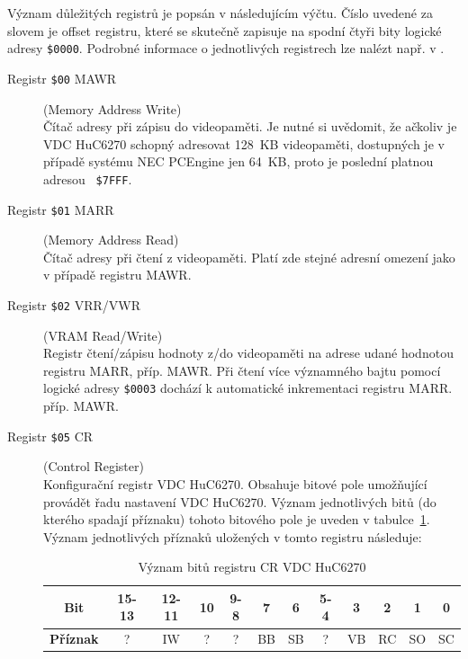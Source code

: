 Význam důležitých registrů je popsán v následujícím výčtu. Číslo uvedené za
slovem  je offset registru, které se skutečně zapisuje na spodní
čtyři bity logické adresy {\tt \$0000}. Podrobné informace o jednotlivých
registrech lze nalézt např. v \cite{Schleussinger98}.

\begin{description}
\item[Registr {\tt \$00} {\sf MAWR}] (Memory Address Write) \\
	Čítač adresy při zápisu do videopaměti. Je nutné si uvědomit, že ačkoliv je
	VDC HuC6270 schopný adresovat 128~KB videopaměti, dostupných je v případě
	systému NEC PCEngine jen 64~KB, proto je poslední platnou adresou {\tt
	\$7FFF}.

\item[Registr {\tt \$01} {\sf MARR}] (Memory Address Read) \\
	Čítač adresy při čtení z videopaměti. Platí zde stejné adresní omezení jako
	v případě registru {\sf MAWR}.

\item[Registr {\tt \$02} {\sf VRR/VWR}] (VRAM Read/Write) \\
	Registr čtení/zápisu hodnoty z/do videopaměti na adrese udané hodnotou
	registru {\sf MARR}, příp. {\sf MAWR}. Při čtení více významného bajtu
	pomocí logické adresy {\tt \$0003} dochází k automatické inkrementaci
	registru {\sf MARR}. příp. {\sf MAWR}.

\item[Registr {\tt \$05} {\sf CR}] (Control Register) \\
	Konfigurační registr VDC HuC6270. Obsahuje bitové pole umožňující provádět
	řadu nastavení VDC HuC6270. Význam jednotlivých bitů (do kterého spadají
	příznaku) tohoto bitového pole je uveden v tabulce~\ref{tab:vdc_cr}. Význam
	jednotlivých příznaků uložených v tomto registru následuje:

	\begin{table}[ht]
	\begin{center}
	\begin{tabular}{|c|c|c|c|c|c|c|c|c|c|c|c|}
	\hline
	\textbf{Bit} & 15-13 & 12-11 & 10 & 9-8 & 7 & 6 & 5-4 & 3 & 2 & 1 & 0 \\
	\hline
	\textbf{Příznak} & ? & IW & ? & ? & BB & SB & ? & VB & RC & SO & SC \\
	\hline
	\end{tabular}
	\end{center}
		\caption{Význam bitů registru {\sf CR} VDC HuC6270\label{tab:vdc_cr}}
	\end{table}


\end{description}
